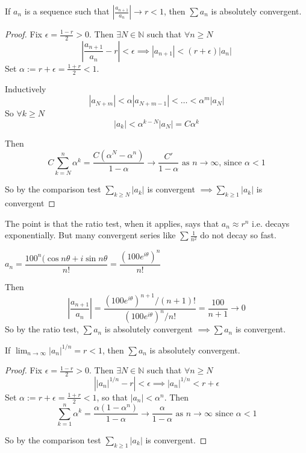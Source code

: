 \documentclass[twoside]{scrartcl}
\begin{document}
\begin{theorem}
If $a_n$ is a sequence such that $\left|\frac{a_{n+1}}{a_n}\right| \to r < 1$, then $\sum a_n$ is absolutely convergent.	
\end{theorem}
\begin{proof}
Fix $\epsilon = \frac{1-r}{2} > 0$. Then $\exists N \in \mathbb{N}$ such that $\forall n \geq N$
\[\left|\frac{a_{n+1}}{a_n} - r\right| < \epsilon \implies |a_{n+1}| < (r + \epsilon)|a_n|\]
Set $\alpha := r + \epsilon = \frac{1 + r}{2} < 1$. 

Inductively
\[|a_{N+m}| < \alpha|a_{N+m-1}| < \dots < \alpha^m|a_N|\]	
So $\forall k \geq N$ \[|a_k| <  \alpha^{k-N}|a_N| = C\alpha^k\]

Then \[C\sum_{k=N}^{n} \alpha^k = \frac{C(\alpha^N-\alpha^n)}{1-\alpha} \to \frac{C'}{1-\alpha} \text{ as } n \to \infty \text{, since } \alpha < 1\]

So by the comparison test $\sum_{k\geq N} |a_k|$ is convergent $\implies \sum_{k\geq 1} |a_k|$ is convergent
\end{proof}

The point is that the ratio test, when it applies, says that $a_n \approx r^n$ i.e. decays exponentially. But many convergent series like $\sum \frac{1}{n^2}$ do not decay so fast.\\

\begin{example}
$a_n = \dfrac{100^n(\cos n\theta + i\sin n\theta}{n!} = \dfrac{(100e^{i\theta})^n}{n!}$

Then 
\[\left|\frac{a_{n+1}}{a_n}\right| = \frac{(100e^{i\theta})^{n+1}/(n+1)!}{(100e^{i\theta})^{n}/n!} = \frac{100}{n+1} \to 0\]
So by the ratio test, $\sum a_n$ is absolutely convergent $\implies \sum a_n$ is convergent.	
\end{example}\vspace*{5pt}

\begin{theorem}
If $\lim_{n\to \infty} |a_n|^{1/n} = r < 1$, then $\sum a_n$ is absolutely convergent.	
\end{theorem}
\begin{proof}
Fix $\epsilon = \frac{1-r}{2} > 0$. Then $\exists N \in \mathbb{N}$ such that $\forall n \geq N$
\[\left||a_n|^{1/n} - r\right| < \epsilon \implies |a_n|^{1/n} < r + \epsilon\]
Set $\alpha := r + \epsilon = \frac{1 + r}{2} < 1$, so that $|a_n| < \alpha^n$. Then
\[ \sum_{k=1}^n\alpha^k = \frac{\alpha(1-\alpha^n)}{1-\alpha}  \to \frac{\alpha}{1-\alpha} \text{ as } n \to \infty \text{ since } \alpha < 1\]

So by the comparison test $\sum_{k\geq 1} |a_k|$ is convergent.
\end{proof}
\end{document}
